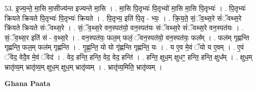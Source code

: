 \documentclass[17pt]{extarticle}
\begin{document}
53. इ॒ज्य॒न्ते॒ मा॒सि मा॒सीज्य॑न्त इज्यन्ते मा॒सि । . मा॒सि पि॒तृभ्यः॑ पि॒तृभ्यो॑ मा॒सि मा॒सि पि॒तृभ्यः॑ । . पि॒तृभ्यः॑ क्रियते क्रियते पि॒तृभ्यः॑ पि॒तृभ्यः॑ क्रियते । . पि॒तृभ्य॒ इति॑ पि॒तृ - भ्यः॒ । . क्रि॒य॒ते॒ सं॒ॅव॒थ्स॒रे सं॑ॅवथ्स॒रे क्रि॑यते क्रियते संॅवथ्स॒रे । . सं॒ॅव॒थ्स॒रे वन॒स्पत॑यो॒ वन॒स्पत॑यः संॅवथ्स॒रे सं॑ॅवथ्स॒रे वन॒स्पत॑यः । . सं॒ॅव॒थ्स॒र इति॑ सं - व॒थ्स॒रे । . वन॒स्पत॑यः॒ फल॒म् फलं॒ ॅवन॒स्पत॑यो॒ वन॒स्पत॑यः॒ फल᳚म् । . फल॑म् गृह्णन्ति गृह्णन्ति॒ फल॒म् फल॑म् गृह्णन्ति । . गृ॒ह्ण॒न्ति॒ यो यो गृ॑ह्णन्ति गृह्णन्ति॒ यः । . य ए॒व मे॒वं ॅयो य ए॒वम् । . ए॒वं ॅवेद॒ वेदै॒व मे॒वं ॅवेद॑ । . वेद॒ हन्ति॒ हन्ति॒ वेद॒ वेद॒ हन्ति॑ । . हन्ति॒ क्षुध॒म् क्षुधꣳ॒॒ हन्ति॒ हन्ति॒ क्षुध᳚म् । . क्षुध॒म् भ्रातृ॑व्य॒म् भ्रातृ॑व्य॒म् क्षुध॒म् क्षुध॒म् भ्रातृ॑व्यम् । . भ्रातृ॑व्य॒मिति॒ भ्रातृ॑व्यम् । \newline

\textbf{Ghana Paata } \newline
\end{document}
